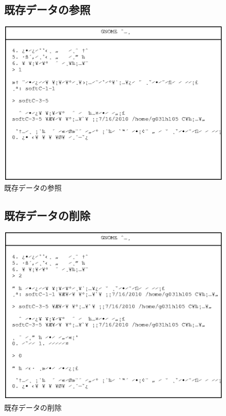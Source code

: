\documentclass[a4j]{jarticle}
\begin{document}
\begin{figure}[h]
\subsection{既存データの参照}
\includegraphics{data_view.eps}
\caption{既存データの参照}
\end{figure}

\begin{figure}[h]
\subsection{既存データの削除}
\includegraphics{data_del.eps}
\caption{既存データの削除}
\end{figure}
\end{document}
